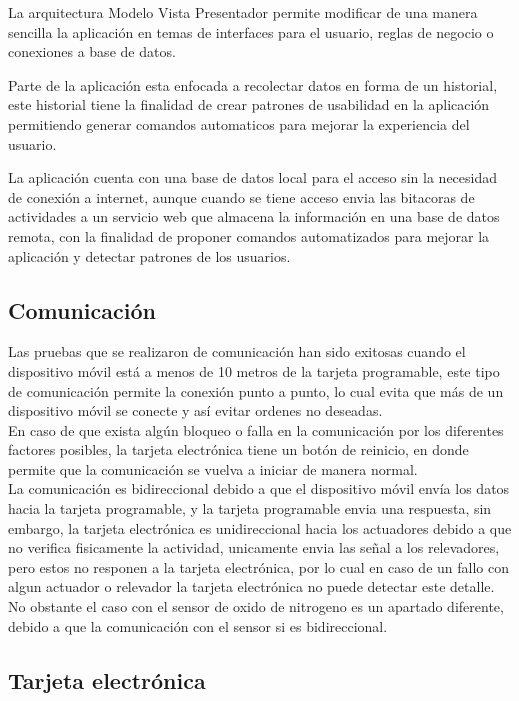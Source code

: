 La arquitectura Modelo Vista Presentador permite modificar de una manera sencilla la aplicación en temas de interfaces para el usuario, reglas de negocio o conexiones a base de datos.

Parte de la aplicación esta enfocada a recolectar datos en forma de un historial, este historial tiene la finalidad de crear patrones de usabilidad en la aplicación permitiendo generar comandos automaticos para mejorar la experiencia del usuario.

La aplicación cuenta con una base de datos local para el acceso sin la necesidad de conexión a internet, aunque cuando se tiene acceso envia las bitacoras de actividades a un servicio web que almacena la información en una base de datos remota, con la finalidad de proponer comandos automatizados para mejorar la aplicación y detectar patrones de los usuarios.

\subsection{Comunicación}

Las pruebas que se realizaron de comunicación han sido exitosas cuando el dispositivo móvil está a menos de 10 metros de la tarjeta programable, este tipo de comunicación permite la conexión punto a punto, lo cual evita que más de un dispositivo móvil se conecte y así evitar ordenes no deseadas.\\

En caso de que exista algún bloqueo o falla en la comunicación por los diferentes factores posibles, la tarjeta electrónica tiene un botón de reinicio, en donde permite que la comunicación se vuelva a iniciar de manera normal.\\

La comunicación es bidireccional debido a que el dispositivo móvil envía los datos hacia la tarjeta programable, y la tarjeta programable envia una respuesta, sin embargo, la tarjeta electrónica es unidireccional hacia los actuadores debido a que no verifica fisicamente la actividad, unicamente envia las señal a los relevadores, pero estos no responen a la tarjeta electrónica, por lo cual en caso de un fallo con algun actuador o relevador la tarjeta electrónica no puede detectar este detalle. No obstante el caso con el sensor de oxido de nitrogeno es un apartado diferente, debido a que la comunicación con el sensor si es bidireccional.\\

\subsection{Tarjeta electrónica}


